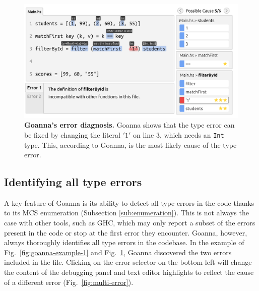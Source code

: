     \begin{figure}[ht!]
        \centering
        \includegraphics[width=\linewidth]{images/goanna-example-2}
        \caption[Goanna's showing possible causes of a type error (2)]{\textbf{Goanna's error diagnosis.} Goanna shows that the type error can be fixed by changing the literal $'1'$ on line 3, which needs an \texttt{Int} type. This, according to Goanna, is the most likely cause of the type error.}
        \label{fig:goanna-example-2}
    \end{figure}


    \subsection{Identifying all type errors} \label{sub:all-errors}
    
    A key feature of Goanna is its ability to detect all type errors in the code thanks to its MCS enumeration (Subsection \ref{sub:enumeration}). This is not always the case with other tools, such as GHC, which may only report a subset of the errors present in the code or stop at the first error they encounter. Goanna, however, always thoroughly identifies all type errors in the codebase. In the example of Fig.~\ref{fig:goanna-example-1} and Fig.~\ref{fig:goanna-example-2}, Goanna discovered the two errors included in the file. Clicking on the error selector on the bottom-left will change the content of the debugging panel and text editor highlights to reflect the cause of a different error (Fig.~\ref{fig:multi-error}). 

